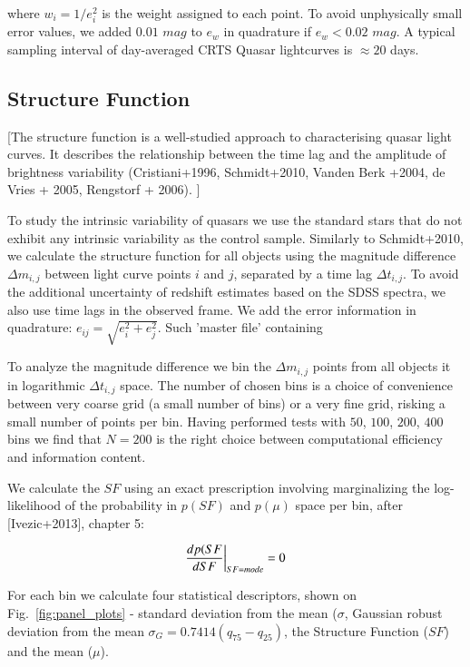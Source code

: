 \documentclass[fleqn,usenatbib]{mnras}  %
\begin{document}
where $ w_{i} = 1 / e_{i}^{2}$ is the weight assigned to each point. To avoid unphysically small error values, we added  $0.01$ $mag$ to $e_{w}$ in quadrature if $e_{w}<0.02$ $mag$. A typical sampling interval of day-averaged CRTS Quasar lightcurves is $\approx 20$ days. 

\subsection{Structure Function}

[The structure function is a well-studied approach to characterising quasar light curves. It describes the relationship between the time lag and the amplitude of brightness variability (Cristiani+1996, Schmidt+2010, Vanden Berk +2004, de Vries + 2005, Rengstorf + 2006). ]

To study  the intrinsic variability of quasars we use the standard stars that do not exhibit any intrinsic variability as the control sample.  Similarly to Schmidt+2010, we  calculate the structure function for all objects  using  the magnitude difference $\Delta m _{i,j}$ between light curve points $i$ and $j$, separated by a time lag $\Delta t_{i,j}$. To avoid the additional uncertainty of redshift estimates based on the SDSS spectra, we also use time lags in the observed frame. We add the error information in quadrature: $e_{ij} = \sqrt{e_{i}^{2}+e_{j}^{2}}$. Such 'master file' containing  

To analyze the magnitude difference  we bin the $\Delta m _{i,j}$ points from all objects  it in logarithmic $\Delta t_{i,j}$  space. The number of chosen bins is a choice of convenience between very coarse grid (a small number of bins) or a very fine grid, risking a small number of points per bin. Having performed tests  with $50$, $100$, $200$, $400$ bins we find that $N=200$ is the right choice between computational efficiency and information content. 

We calculate the $SF$ using an exact prescription involving marginalizing the log-likelihood of the probability in $p(SF)$ and $p(\mu)$ space per bin, after [Ivezic+2013], chapter 5: 
 
\begin{equation}
\centering
\frac{d p(SF}{d SF } \bigg| _{SF = mode} = 0
\end{equation}

For each bin we calculate four statistical descriptors, shown on Fig.~\ref{fig:panel_plots} -  standard deviation from the mean ($\sigma$, Gaussian robust deviation from the mean $\sigma_{G}=0.7414 (q_{75}-q_{25})$, the Structure Function ($SF$) and the mean ($\mu$).  
\end{document}
